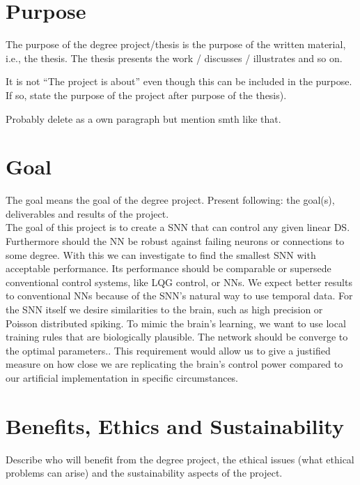 \section{Purpose}
The purpose of the degree project/thesis is the purpose of the written material, i.e., the thesis. The thesis presents the work / discusses / illustrates and so on.

It is not “The project is about” even though this can be included in the purpose. If so, state the purpose of the project after purpose of the thesis).

Probably delete as a own paragraph but mention smth like that.

\section{Goal}
The goal means the goal of the degree project. Present following: the goal(s), deliverables and results of the project.\\

The goal of this project is to create a \ac{SNN} that can control  any given linear \ac{DS}. Furthermore should the \ac{NN} be robust against failing neurons or connections to some degree. With this we can investigate to find the smallest \ac{SNN} with acceptable performance.
Its performance should be comparable or supersede conventional control systems, like \ac{LQG} control, or \acp{NN}. We expect better results to conventional \acp{NN} because of the \ac{SNN}'s natural way to use temporal data. For the \ac{SNN} itself we desire similarities to the brain, such as high precision or Poisson distributed spiking.
To mimic the brain's learning, we want to use local training rules that are biologically plausible. The network should be converge to the optimal parameters.. This requirement would allow us to give a justified measure on how close we are replicating the brain's control power compared to our artificial implementation in specific circumstances.

\section{Benefits, Ethics and Sustainability}
Describe who will benefit from the degree project, the ethical issues (what ethical problems can arise) and the sustainability aspects of the project.

